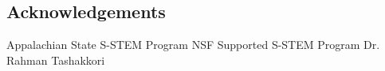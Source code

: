 \documentclass[a0,portrait]{a0poster}
\begin{document}
\begin{multicols}{2}
\section*{Acknowledgements}

Appalachian State S-STEM Program\newline
NSF Supported S-STEM Program\newline
Dr. Rahman Tashakkori


\end{multicols}
\end{document}
